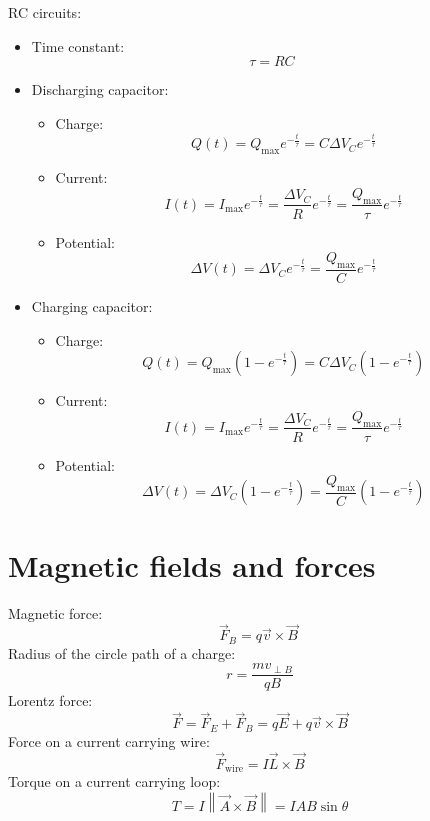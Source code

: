 \documentclass[10pt, twocolumn]{article}
\begin{document}
RC circuits:
\begin{itemize}
  \item Time constant:
        \[
          \tau = RC
        \]
  \item Discharging capacitor:
        \begin{itemize}
          \item Charge:
                \[
                  Q\left( t \right) = Q_{\mathrm{max}}e^{-\frac{t}{\tau}} = C\Delta V_C e^{-\frac{t}{\tau}}
                \]
          \item Current:
                \[
                  I\left( t \right) = I_{\mathrm{max}}e^{-\frac{t}{\tau}} = \frac{\Delta V_C }{R}e^{-\frac{t}{\tau}} = \frac{Q_{\mathrm{max}}}{\tau}e^{-\frac{t}{\tau}}
                \]
          \item Potential:
                \[
                  {\Delta V}\left( t \right) = \Delta V_C e^{-\frac{t}{\tau}} = \frac{Q_{\mathrm{max}}}{C}e^{-\frac{t}{\tau}}
                \]
        \end{itemize}
        \columnbreak
  \item Charging capacitor:
        \begin{itemize}
          \item Charge:
                \[
                  Q\left( t \right) = Q_{\mathrm{max}}\left( 1 - e^{- \frac{t}{\tau}} \right) = C\Delta V_C \left( 1 - e^{- \frac{t}{\tau}} \right)
                \]
          \item Current:
                \[
                  I\left( t \right) = I_{\mathrm{max}}e^{- \frac{t}{\tau}} = \frac{\Delta V_C }{R}e^{- \frac{t}{\tau}} = \frac{Q_{\mathrm{max}}}{\tau}e^{- \frac{t}{\tau}}
                \]
          \item Potential:
                \[
                  \Delta V\left( t \right) = \Delta V_C \left( 1 - e^{- \frac{t}{\tau}} \right) = \frac{Q_{\mathrm{max}}}{C}\left( 1 - e^{- \frac{t}{\tau}} \right)
                \]
        \end{itemize}
\end{itemize}

\section{Magnetic fields and forces}
Magnetic force:
\[
  \vec{F}_B = q\vec{v} \times \vec{B}\
\]
Radius of the circle path of a charge:
\[
  r = \frac{mv_{\perp  B}}{qB}
\]
Lorentz force:
\[
  \vec{F} = \vec{F}_E + \vec{F}_B = q\vec{E} + q\vec{v} \times \vec{B}
\]
Force on a current carrying wire:
\[
  \vec{F}_{\mathrm{wire}} = I\vec{L} \times \vec{B}
\]
Torque on a current carrying loop:
\[
  T = I\left\| \vec{A} \times \vec{B} \right\| = IAB\sin{\theta}
\]
\end{document}
